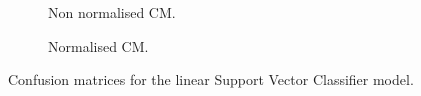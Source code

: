 \begin{figure}[ht]
    \centering
    \begin{subfigure}{.45\textwidth}
        \centering
        \captionsetup{width=0.9\linewidth}
        \captionsetup{justification=centering}
        \caption{Non normalised CM.}
    \end{subfigure}
    \hspace{1cm}
    \begin{subfigure}{.45\textwidth}
        \centering
        \captionsetup{width=0.9\linewidth}
        \captionsetup{justification=centering}
        \caption{Normalised CM.}
    \end{subfigure}
    \captionsetup{width=0.9\linewidth}
    \captionsetup{justification=centering}
    \caption{Confusion matrices for the linear Support Vector Classifier model.}
    \label{fig:ma_linsvc_cm}
\end{figure}



